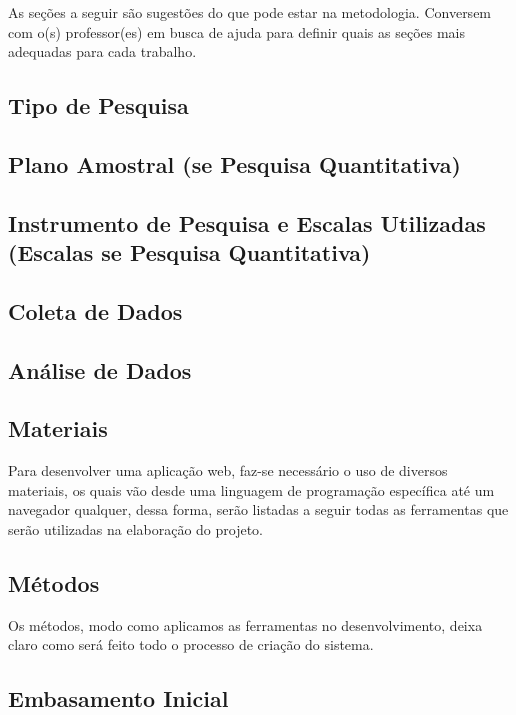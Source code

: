 \documentclass[
	article,			%
	12pt,				%
	oneside,			%
	a4paper,			%
    BIBLATEX,           %
	english,			%
	brazil,				%
	sumario=tradicional
	]{abntex2}
\begin{document}
As seções a seguir são sugestões do que pode estar na metodologia. Conversem com o(s) professor(es) em busca de ajuda para definir quais as seções mais adequadas para cada trabalho.

\subsection{Tipo de Pesquisa}
\lipsum[1]

\subsection{Plano Amostral (se Pesquisa Quantitativa)}
\lipsum[1]

\subsection{Instrumento de Pesquisa e Escalas Utilizadas (Escalas se Pesquisa Quantitativa)}
\lipsum[1]

\subsection{Coleta de Dados}
\lipsum[1]

\subsection{Análise de Dados}
\lipsum[1]

\subsection{Materiais}
Para desenvolver uma aplicação web, faz-se necessário o uso de diversos materiais, os quais vão desde uma linguagem de programação específica até um navegador qualquer, dessa forma, serão listadas a seguir todas as ferramentas que serão utilizadas na elaboração do projeto.
	
 \subsection{Métodos}
Os métodos, modo como aplicamos as ferramentas no desenvolvimento, deixa claro como será feito todo o processo de criação do sistema.

\subsection{Embasamento Inicial}
\lipsum[1]
\end{document}
